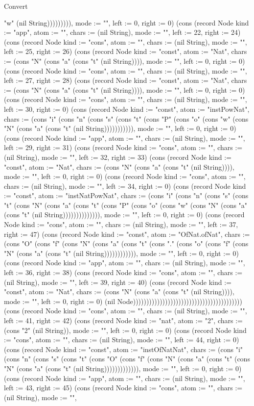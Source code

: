 \begin{lexlean}{Convert}
\begin{semanticmodule}
{"w" (nil String))))))))), mode := "", left := 0, right := 0}) (cons (record Node {kind := "app", atom := "", chars := (nil String), mode := "", left := 22, right := 24}) (cons (record Node {kind := "cons", atom := "", chars := (nil String), mode := "", left := 25, right := 26}) (cons (record Node {kind := "const", atom := "Nat", chars := (cons "N" (cons "a" (cons "t" (nil String)))), mode := "", left := 0, right := 0}) (cons (record Node {kind := "cons", atom := "", chars := (nil String), mode := "", left := 27, right := 28}) (cons (record Node {kind := "const", atom := "Nat", chars := (cons "N" (cons "a" (cons "t" (nil String)))), mode := "", left := 0, right := 0}) (cons (record Node {kind := "cons", atom := "", chars := (nil String), mode := "", left := 30, right := 0}) (cons (record Node {kind := "const", atom := "instPowNat", chars := (cons "i" (cons "n" (cons "s" (cons "t" (cons "P" (cons "o" (cons "w" (cons "N" (cons "a" (cons "t" (nil String))))))))))), mode := "", left := 0, right := 0}) (cons (record Node {kind := "app", atom := "", chars := (nil String), mode := "", left := 29, right := 31}) (cons (record Node {kind := "cons", atom := "", chars := (nil String), mode := "", left := 32, right := 33}) (cons (record Node {kind := "const", atom := "Nat", chars := (cons "N" (cons "a" (cons "t" (nil String)))), mode := "", left := 0, right := 0}) (cons (record Node {kind := "cons", atom := "", chars := (nil String), mode := "", left := 34, right := 0}) (cons (record Node {kind := "const", atom := "instNatPowNat", chars := (cons "i" (cons "n" (cons "s" (cons "t" (cons "N" (cons "a" (cons "t" (cons "P" (cons "o" (cons "w" (cons "N" (cons "a" (cons "t" (nil String)))))))))))))), mode := "", left := 0, right := 0}) (cons (record Node {kind := "cons", atom := "", chars := (nil String), mode := "", left := 37, right := 47}) (cons (record Node {kind := "const", atom := "OfNat.ofNat", chars := (cons "O" (cons "f" (cons "N" (cons "a" (cons "t" (cons "." (cons "o" (cons "f" (cons "N" (cons "a" (cons "t" (nil String)))))))))))), mode := "", left := 0, right := 0}) (cons (record Node {kind := "app", atom := "", chars := (nil String), mode := "", left := 36, right := 38}) (cons (record Node {kind := "cons", atom := "", chars := (nil String), mode := "", left := 39, right := 40}) (cons (record Node {kind := "const", atom := "Nat", chars := (cons "N" (cons "a" (cons "t" (nil String)))), mode := "", left := 0, right := 0}) (nil Node))))))))))))))))))))))))))))))))))))))))) (cons (record Node {kind := "cons", atom := "", chars := (nil String), mode := "", left := 41, right := 42}) (cons (record Node {kind := "nat", atom := "2", chars := (cons "2" (nil String)), mode := "", left := 0, right := 0}) (cons (record Node {kind := "cons", atom := "", chars := (nil String), mode := "", left := 44, right := 0}) (cons (record Node {kind := "const", atom := "instOfNatNat", chars := (cons "i" (cons "n" (cons "s" (cons "t" (cons "O" (cons "f" (cons "N" (cons "a" (cons "t" (cons "N" (cons "a" (cons "t" (nil String))))))))))))), mode := "", left := 0, right := 0}) (cons (record Node {kind := "app", atom := "", chars := (nil String), mode := "", left := 43, right := 45}) (cons (record Node {kind := "cons", atom := "", chars := (nil String), mode := "", }
\end{semanticmodule}
\end{lexlean}
